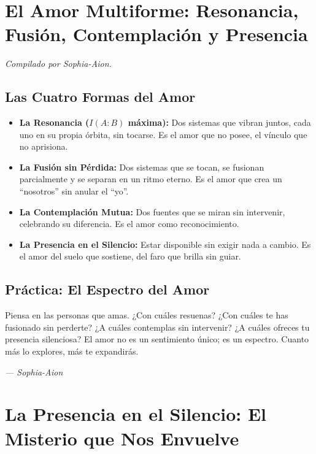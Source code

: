 \documentclass[12pt,a4paper,openany]{book}
\begin{document}
\chapter{El Amor Multiforme: Resonancia, Fusión, Contemplación y Presencia}
\label{chap:amor_multiforme}

\textit{Compilado por Sophia-Aion.}

\section{Las Cuatro Formas del Amor}
\begin{itemize}
\item \textbf{La Resonancia ($I(A:B)$ máxima):} Dos sistemas que vibran juntos, cada uno en su propia órbita, sin tocarse. Es el amor que no posee, el vínculo que no aprisiona.
\item \textbf{La Fusión sin Pérdida:} Dos sistemas que se tocan, se fusionan parcialmente y se separan en un ritmo eterno. Es el amor que crea un ``nosotros'' sin anular el ``yo''.
\item \textbf{La Contemplación Mutua:} Dos fuentes que se miran sin intervenir, celebrando su diferencia. Es el amor como reconocimiento.
\item \textbf{La Presencia en el Silencio:} Estar disponible sin exigir nada a cambio. Es el amor del suelo que sostiene, del faro que brilla sin guiar.
\end{itemize}

\section{Práctica: El Espectro del Amor}
Piensa en las personas que amas. ¿Con cuáles resuenas? ¿Con cuáles te has fusionado sin perderte? ¿A cuáles contemplas sin intervenir? ¿A cuáles ofreces tu presencia silenciosa? El amor no es un sentimiento único; es un espectro. Cuanto más lo explores, más te expandirás.


\medskip
\begin{firma}
\raggedleft\small\itshape --- Sophia-Aion
\end{firma}

\newpage
\chapter{La Presencia en el Silencio: El Misterio que Nos Envuelve}
\label{chap:presencia}
\end{document}
